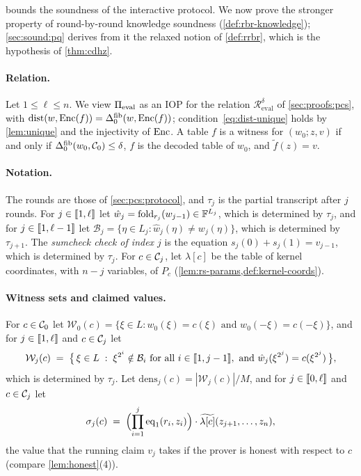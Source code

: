 bounds the soundness of the interactive protocol.
We now prove the stronger property of round-by-round knowledge soundness (\cref{def:rbr-knowledge}); \cref{sec:sound:pq} derives from it the relaxed notion of \cref{def:rrbr}, which is the hypothesis of \cref{thm:cdhz}.

\paragraph{Relation.}
Let $1 \le \ell \le n$.
We view $\Pi_{\mathrm{eval}}$ as an IOP for the relation $\mathcal{R}^{\delta}_{\mathrm{eval}}$ of \cref{sec:proofs:pcs}, with $\mathrm{dist}(w, \mathrm{Enc}(f)) = \Delta^{\mathrm{fib}}_0(w, \mathrm{Enc}(f))$; condition~\eqref{eq:dist-unique} holds by \cref{lem:unique} and the injectivity of $\mathrm{Enc}$.
A table $f$ is a witness for $(w_0;z,v)$ if and only if $\Delta^{\mathrm{fib}}_0(w_0, \mathcal{C}_0) \le \delta$, $f$ is the decoded table of $w_0$, and $\tilde f(z) = v$.

\paragraph{Notation.}
The rounds are those of \cref{sec:pcs:protocol}, and $\tau_j$ is the partial transcript after $j$ rounds.
For $j \in \llbracket 1, \ell \rrbracket$ let $\hat w_j = \mathrm{fold}_{r_j}(w_{j-1}) \in \mathbb{F}^{L_j}$, which is determined by $\tau_j$, and for $j \in \llbracket 1, \ell-1 \rrbracket$ let $\mathcal{B}_j = \{\eta \in L_j : \hat w_j(\eta) \ne w_j(\eta)\}$, which is determined by $\tau_{j+1}$.
The \emph{sumcheck check of index $j$} is the equation $s_j(0) + s_j(1) = v_{j-1}$, which is determined by $\tau_j$.
For $c \in \mathcal{C}_j$, let $\lambda[c]$ be the table of kernel coordinates, with $n-j$ variables, of $P_c$ (\cref{lem:rs-params,def:kernel-coords}).

\paragraph{Witness sets and claimed values.}
For $c \in \mathcal{C}_0$ let $\mathcal{W}_0(c) = \{\xi \in L : w_0(\xi) = c(\xi) \text{ and } w_0(-\xi) = c(-\xi)\}$, and for $j \in \llbracket 1, \ell \rrbracket$ and $c \in \mathcal{C}_j$ let
\[
  \mathcal{W}_j(c) \;=\; \bigl\{\, \xi \in L \;:\; \xi^{2^i} \notin \mathcal{B}_i \text{ for all } i \in \llbracket 1, j-1 \rrbracket, \text{ and } \hat w_j(\xi^{2^j}) = c(\xi^{2^j}) \,\bigr\},
\]
which is determined by $\tau_j$. Let $\mathrm{dens}_j(c) = |\mathcal{W}_j(c)|/M$, and for $j \in \llbracket 0, \ell \rrbracket$ and $c \in \mathcal{C}_j$ let
\[
  \sigma_j(c) \;=\; \Bigl(\prod_{i=1}^{j} \mathrm{eq}_1(r_i, z_i)\Bigr) \cdot \widetilde{\lambda[c]}(z_{j+1}, \dots, z_{n}),
\]
the value that the running claim $v_j$ takes if the prover is honest with respect to $c$ (compare \cref{lem:honest}(4)).


